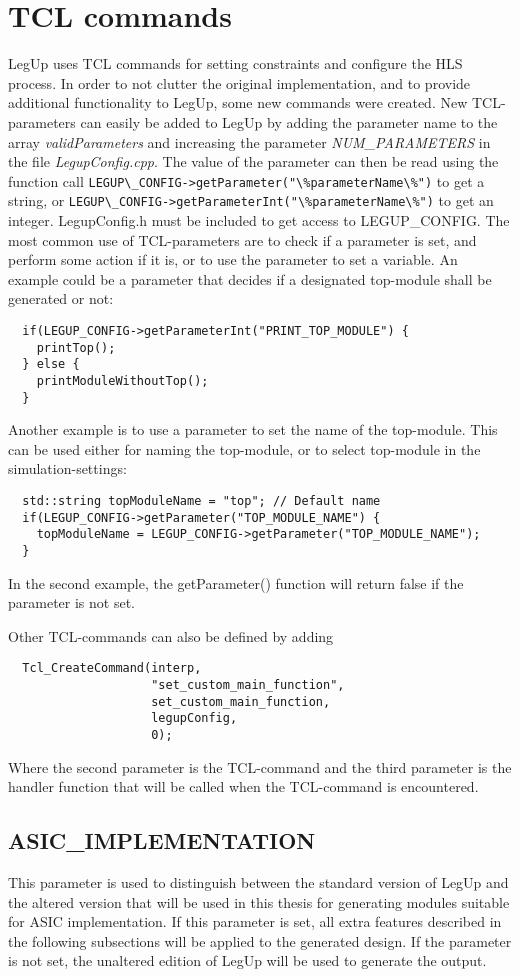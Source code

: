 \section{TCL commands}
LegUp uses TCL commands for setting constraints and configure the HLS process. In order to not clutter the original implementation, and to provide additional functionality to LegUp, some new commands were created. New TCL-parameters can easily be added to LegUp by adding the parameter name to the array \textit{validParameters} and increasing the parameter \textit{NUM\_PARAMETERS} in the file \textit{LegupConfig.cpp}. The value of the parameter can then be read using the function call \verb!LEGUP\_CONFIG->getParameter("\%parameterName\%")! to get a string, or \verb!LEGUP\_CONFIG->getParameterInt("\%parameterName\%")! to get an integer. LegupConfig.h must be included to get access to LEGUP\_CONFIG. The most common use of TCL-parameters are to check if a parameter is set, and perform some action if it is, or to use the parameter to set a variable. An example could be a parameter that decides if a designated top-module shall be generated or not:
\lstset{language=C++,style=Cstyle}
\begin{lstlisting}
  if(LEGUP_CONFIG->getParameterInt("PRINT_TOP_MODULE") {
    printTop();
  } else {
    printModuleWithoutTop();
  }
\end{lstlisting}
Another example is to use a parameter to set the name of the top-module. This can be used either for naming the top-module, or to select top-module in the simulation-settings:
\begin{lstlisting}
  std::string topModuleName = "top"; // Default name
  if(LEGUP_CONFIG->getParameter("TOP_MODULE_NAME") {
    topModuleName = LEGUP_CONFIG->getParameter("TOP_MODULE_NAME");
  }
\end{lstlisting}
In the second example, the getParameter() function will return false if the parameter is not set.

Other TCL-commands can also be defined by adding 
\begin{lstlisting}
  Tcl_CreateCommand(interp,
                    "set_custom_main_function",
                    set_custom_main_function,
                    legupConfig,
                    0);
\end{lstlisting}
Where the second parameter is the TCL-command and the third parameter is the handler function that will be called when the TCL-command is encountered.

\subsection{ASIC\_IMPLEMENTATION}
This parameter is used to distinguish between the standard version of LegUp and the altered version that will be used in this thesis for generating modules suitable for ASIC implementation. If this parameter is set, all extra features described in the following subsections will be applied to the generated design. If the parameter is not set, the unaltered edition of LegUp will be used to generate the output.

